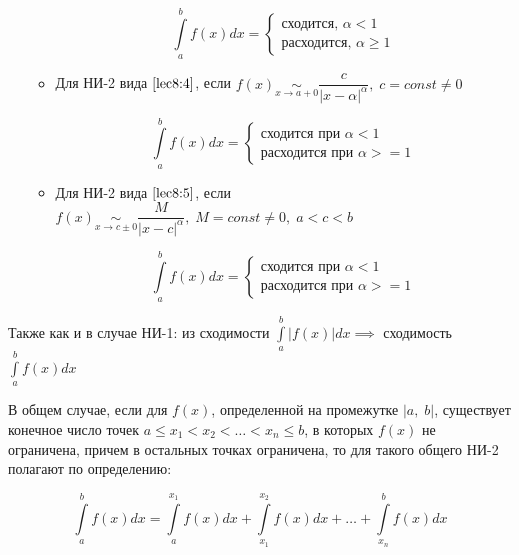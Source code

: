 \documentclass[../../main.tex]{subfiles}
\begin{document}
\begin{enumerate}
\begin{itemize}
 \[\int\limits_{a}^{b} f(x)dx = \begin{cases}
                                 \text{сходится, } \alpha < 1\\
                                 \text{расходится, } \alpha \geq 1
                                \end{cases}\]
                                
\item Для НИ-2 вида $\eqref{lec8:4}$, если $f(x) \underset{x \to a + 0}\sim 
\dfrac{c}{\left|x - \alpha\right|^{\alpha}}, \; c = const \neq 0$

\[\int\limits_{a}^{b}f(x)dx = \begin{cases}
                               \text{сходится при } \alpha < 1\\
                               \text{расходится при } \alpha >= 1
                              \end{cases}
\]                                                    
                                                    
\item Для НИ-2 вида $\eqref{lec8:5}$, если $f(x) \underset{x \to c \pm 
0}\sim \dfrac{M}{\left|x - c\right|^{\alpha}}, \; M = const \neq 0,\; a < c < 
b$

\[\int\limits_{a}^{b}f(x)dx = \begin{cases}
                               \text{сходится при } \alpha < 1\\
                               \text{расходится при } \alpha >= 1
                              \end{cases}
\]
 \end{itemize}
\end{enumerate}


Также как и в случае НИ-1: из сходимости 
$\displaystyle\int\limits_{a}^{b}\left|f(x)\right|dx \implies $ сходимость 
$\displaystyle\int\limits_{a}^{b}f(x)dx$

В общем случае, если для $f(x)$, определенной на промежутке $\left|a, \; 
b\right|$, существует конечное число точек $a \leq x_1 < x_2 < \ldots < x_n 
\leq b$, в которых $f(x)$ не ограничена, причем в остальных точках 
ограничена, то для такого общего НИ-2 полагают по определению:

\begin{equation} \label{lec8:6}
\int\limits_{a}^{b}f(x)dx = \int\limits_{a}^{x_1}f(x)dx + 
\int\limits_{x_1}^{x_2}f(x)dx + \ldots + \int\limits_{x_n}^{b}f(x)dx
\end{equation}
\end{document}
